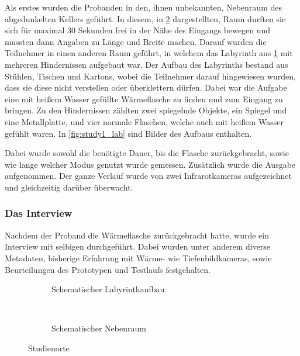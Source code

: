 Als erstes wurden die Probanden in den, ihnen unbekannten, Nebenraum des abgedunkelten Kellers geführt.
In diesem, in \cref{fig:study1_room} dargestellten, Raum durften sie sich für maximal 30 Sekunden frei in der Nähe des Eingangs bewegen und mussten dann Angaben zu Länge und Breite machen.
Darauf wurden die Teilnehmer in einen anderen Raum geführt, in welchem das Labyrinth aus \cref{fig:study1_labyrinth} mit mehreren Hindernissen aufgebaut war.
Der Aufbau des Labyrinths bestand aus Stühlen, Tischen und Kartons, wobei die Teilnehmer darauf hingewiesen wurden, dass sie diese nicht verstellen oder überklettern dürfen.
Dabei war die Aufgabe eine mit heißem Wasser gefüllte Wärmeflasche zu finden und zum Eingang zu bringen.
Zu den Hindernissen zählten zwei spiegelnde Objekte, ein Spiegel und eine Metallplatte, und vier normale Flaschen, welche auch mit heißem Wasser gefühlt waren.
In \cref{fig:study1_lab} sind Bilder des Aufbaus enthalten.

Dabei wurde sowohl die benötigte Dauer, bis die Flasche zurückgebracht, sowie wie lange welcher Modus genutzt wurde gemessen.
Zusätzlich wurde die Ausgabe aufgenommen.
Der ganze Verlauf wurde von zwei Infrarotkameras aufgezeichnet und gleichzeitig darüber überwacht.

\subsubsection{Das Interview}
Nachdem der Proband die Wärmeflasche zurückgebracht hatte, wurde ein Interview mit selbigen durchgeführt.
Dabei wurden unter anderem diverse Metadaten, bisherige Erfahrung mit Wärme- wie Tiefenbildkameras, sowie Beurteilungen des Prototypen und Testlaufs festgehalten.

\begin{figure}[H]
	\centering
	\begin{subfigure}[t]{0.65\textwidth}
		\centering
		\caption{Schematischer Labyrinthaufbau}
		\label{fig:study1_labyrinth}
	\end{subfigure}
	~
	\begin{subfigure}[t]{0.3\textwidth}
		\centering
		\caption{Schematischer Nebenraum}
		\label{fig:study1_room}
	\end{subfigure}
	\caption{Studienorte}
	\label{fig:study1_keller}
\end{figure}

